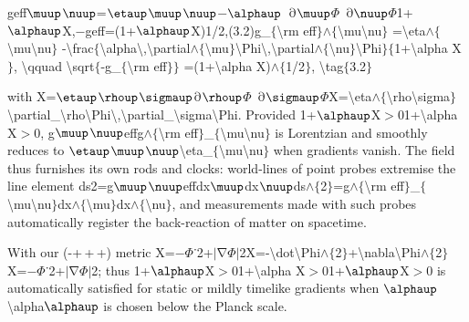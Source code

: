 \documentclass{iopjournal}
\begin{document}
geff$\muup$$\nuup$=$\etaup$$\muup$$\nuup$$\mathrm{-}$$\alphaup$\ $\mathrm{\partial}$$\muup$$\Phi$\ $\mathrm{\partial}$$\nuup$$\Phi$1+$\alphaup$X,$\mathrm{-}$geff=(1+$\alphaup$X)1/2,(3.2)g\_$\mathrm{\{}${\textbackslash}rm eff$\mathrm{\}}$$\mathrm{\wedge}$$\mathrm{\{}${\textbackslash}mu{\textbackslash}nu$\mathrm{\}}$ ={\textbackslash}eta$\mathrm{\wedge}$$\mathrm{\{}${\textbackslash}mu{\textbackslash}nu$\mathrm{\}}$ -{\textbackslash}frac$\mathrm{\{}${\textbackslash}alpha{\textbackslash},{\textbackslash}partial$\mathrm{\wedge}$$\mathrm{\{}${\textbackslash}mu$\mathrm{\}}${\textbackslash}Phi{\textbackslash},{\textbackslash}partial$\mathrm{\wedge}$$\mathrm{\{}${\textbackslash}nu$\mathrm{\}}${\textbackslash}Phi$\mathrm{\}}$$\mathrm{\{}$1+{\textbackslash}alpha X$\mathrm{\}}$, {\textbackslash}qquad {\textbackslash}sqrt$\mathrm{\{}$-g\_$\mathrm{\{}${\textbackslash}rm eff$\mathrm{\}}$$\mathrm{\}}$ =(1+{\textbackslash}alpha X)$\mathrm{\wedge}$$\mathrm{\{}$1/2$\mathrm{\}}$, {\textbackslash}tag$\mathrm{\{}$3.2$\mathrm{\}}$

with X=$\etaup$$\rhoup$$\sigmaup$$\mathrm{\partial}$$\rhoup$$\Phi$\ $\mathrm{\partial}$$\sigmaup$$\Phi$X={\textbackslash}eta$\mathrm{\wedge}$$\mathrm{\{}${\textbackslash}rho{\textbackslash}sigma$\mathrm{\}}${\textbackslash}partial\_{\textbackslash}rho{\textbackslash}Phi{\textbackslash},{\textbackslash}partial\_{\textbackslash}sigma{\textbackslash}Phi. Provided 1+$\alphaup$X$\mathrm{>}$01+{\textbackslash}alpha X$\mathrm{>}$0, g$\muup$$\nuup$effg$\mathrm{\wedge}$$\mathrm{\{}${\textbackslash}rm eff$\mathrm{\}}$\_$\mathrm{\{}${\textbackslash}mu{\textbackslash}nu$\mathrm{\}}$ is Lorentzian and smoothly reduces to $\etaup$$\muup$$\nuup${\textbackslash}eta\_$\mathrm{\{}${\textbackslash}mu{\textbackslash}nu$\mathrm{\}}$ when gradients vanish. The field thus furnishes its own rods and clocks: world-lines of point probes extremise the line element ds2=g$\muup$$\nuup$effdx$\muup$dx$\nuup$ds$\mathrm{\wedge}$$\mathrm{\{}$2$\mathrm{\}}$=g$\mathrm{\wedge}$$\mathrm{\{}${\textbackslash}rm eff$\mathrm{\}}$\_$\mathrm{\{}${\textbackslash}mu{\textbackslash}nu$\mathrm{\}}$dx$\mathrm{\wedge}$$\mathrm{\{}${\textbackslash}mu$\mathrm{\}}$dx$\mathrm{\wedge}$$\mathrm{\{}${\textbackslash}nu$\mathrm{\}}$, and measurements made with such probes automatically register the back-reaction of matter on spacetime.

With our (-+ + +) metric X=$\mathrm{-}$$\Phi$˙2+$\mathrm{\mid }$$\mathrm{\nabla }$$\Phi$$\mathrm{\mid }$2X=-{\textbackslash}dot{\textbackslash}Phi$\mathrm{\wedge}$$\mathrm{\{}$2$\mathrm{\}}$+{\textbar}{\textbackslash}nabla{\textbackslash}Phi{\textbar}$\mathrm{\wedge}$$\mathrm{\{}$2$\mathrm{\}}$X=$\mathrm{-}$$\Phi$˙2+$\mathrm{\mid }$$\mathrm{\nabla }$$\Phi$$\mathrm{\mid }$2; thus 1+$\alphaup$X$\mathrm{>}$01+{\textbackslash}alpha X$\mathrm{>}$01+$\alphaup$X$\mathrm{>}$0 is automatically satisfied for static or mildly timelike gradients when $\alphaup${\textbackslash}alpha$\alphaup$ is chosen below the Planck scale.
\end{document}
